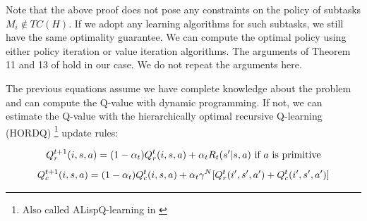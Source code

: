 Note that the above proof does not pose any constraints on the policy of subtasks $M_i \notin TC(H)$. 
If we adopt any learning algorithms for such subtasks, we still have the same optimality guarantee. 
We can compute the optimal policy using either policy iteration or value iteration algorithms. The arguments of
Theorem 11 and 13 of \cite{HORDQ} hold in our case. We do not repeat the arguments here.
 
The previous equations assume we have complete knowledge about the problem and can compute
the Q-value with dynamic programming. If not, we can estimate the Q-value with
the hierarchically optimal recursive Q-learning (HORDQ) \footnote{Also called ALispQ-learning in \cite{OptimalQ}} \cite{HORDQ} 
update rules:

\begin{equation}
    Q_r^{t+1}(i, s, a) =
    (1 - \alpha_t)Q_r^t(i, s, a) + \alpha_t R_t(s'| s, a)   \mbox{ if $a$ is primitive} \\
    \label{eq:TdQr}
\end{equation}
\begin{equation}
    Q_c^{t+1}(i, s, a) =
    (1 - \alpha_t)Q_c^t(i, s, a) + \alpha_t \gamma^N[Q_r^{t}(i', s', a') + Q_c^t(i', s', a')] \\
    \label{eq:TdQc}
\end{equation}

